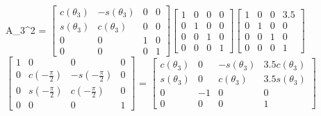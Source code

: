 \documentclass[12pt]{article}
\begin{document}
\begin{center}
    A_3^2 = $\left[\begin{matrix}c{\left(\theta_{3}\right)} & - s{\left(\theta_{3} \right)} & 0 & 0\\s{\left(\theta_{3} \right)} & c{\left(\theta_{3} \right)} & 0 & 0\\0 & 0 & 1 & 0\\0 & 0 & 0 & 1\end{matrix}\right]$$\left[\begin{matrix}1 & 0 & 0 & 0\\0 & 1 & 0 & 0\\0 & 0 & 1 & 0\\0 & 0 & 0 & 1\end{matrix}\right]$$\left[\begin{matrix}1 & 0 & 0 & 3.5\\0 & 1 & 0 & 0\\0 & 0 & 1 & 0\\0 & 0 & 0 & 1\end{matrix}\right]$$\left[\begin{matrix}1 & 0 & 0 & 0\\0 & c{\left(-\frac{\pi}{2} \right)} & - s{\left(-\frac{\pi}{2} \right)} & 0\\0 & s{\left(-\frac{\pi}{2} \right)} & c{\left(-\frac{\pi}{2} \right)} & 0\\0 & 0 & 0 & 1\end{matrix}\right]$\newline
    = $\left[\begin{matrix}c{\left(\theta_{3} \right)} & 0 & - s{\left(\theta_{3} \right)} & 3.5 c{\left(\theta_{3} \right)}\\s{\left(\theta_{3} \right)} & 0 & c{\left(\theta_{3} \right)} & 3.5 s{\left(\theta_{3} \right)}\\0 & -1 & 0 & 0\\0 & 0 & 0 & 1\end{matrix}\right]$\newline\newline
    

\end{center}
\end{document}
